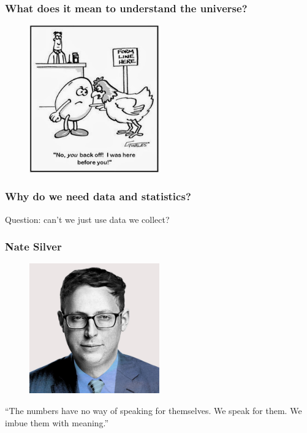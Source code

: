 \documentclass[handout]{beamer}
\begin{document}
\begin{frame}
	\frametitle{What does it mean to understand the universe?}
	
	\begin{figure}[ht]
		\centerline{\includegraphics[width=0.5\textwidth]{../figures/chicken_egg.jpeg}}
	\end{figure}
	
\end{frame}

\begin{frame}
	\frametitle{Why do we need data and statistics?}
	
	\Large
	Question: can't we just use data we collect?
	
\end{frame}

\begin{frame}
	\frametitle{Nate Silver}
	
	\begin{figure}[ht]
		\centerline{\includegraphics[width=0.5\textwidth]{../figures/natesilver.jpeg}}
	\end{figure}
	
	``The numbers have no way of speaking for themselves. We speak for them. We imbue them with meaning.''
	
\end{frame}
\end{document}
